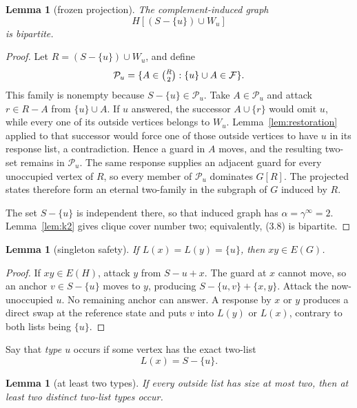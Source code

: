 \documentclass[11pt]{article}
\newtheorem{lemma}[theorem]{Lemma}
\theoremstyle{definition}
\theoremstyle{remark}
\newcommand{\gaminf}{\gamma^{\infty}}
\newcommand{\F}{\mathcal F}
\begin{document}
\begin{lemma}[frozen projection]\label{lem:frozen}
The complement-induced graph
\[
  H[(S-\{u\})\cup W_u]
\tag{3.8}
\]
is bipartite.
\end{lemma}

\begin{proof}
Let \(R=(S-\{u\})\cup W_u\), and define
\[
 \mathcal P_u=
 \{A\in\tbinom{R}{2}:\{u\}\cup A\in\F\}.
\]
This family is nonempty because \(S-\{u\}\in\mathcal P_u\).
Take \(A\in\mathcal P_u\) and attack \(r\in R-A\) from
\(\{u\}\cup A\).  If \(u\) answered, the successor \(A\cup\{r\}\)
would omit \(u\), while every one of its outside vertices belongs to
\(W_u\).  Lemma~\ref{lem:restoration} applied to that successor would
force one of those outside vertices to have \(u\) in its response list,
a contradiction.  Hence a guard in \(A\) moves, and the resulting
two-set remains in \(\mathcal P_u\).  The same response supplies an
adjacent guard for every unoccupied vertex of \(R\), so every member of
\(\mathcal P_u\) dominates \(G[R]\).  The projected states therefore form
an eternal two-family in the subgraph of \(G\) induced by \(R\).

The set \(S-\{u\}\) is independent there, so that induced graph has
\(\alpha=\gaminf=2\).  Lemma~\ref{lem:k2} gives clique cover number two;
equivalently, (3.8) is bipartite.
\end{proof}

\begin{lemma}[singleton safety]\label{lem:singleton}
If \(L(x)=L(y)=\{u\}\), then \(xy\in E(G)\).
\end{lemma}

\begin{proof}
If \(xy\in E(H)\), attack \(y\) from \(S-u+x\).  The guard at \(x\) cannot
move, so an anchor \(v\in S-\{u\}\) moves to \(y\), producing
\(S-\{u,v\}+\{x,y\}\).  Attack the now-unoccupied \(u\).  No remaining
anchor can answer.  A response by \(x\) or \(y\) produces a direct swap at
the reference state and puts \(v\) into \(L(y)\) or \(L(x)\), contrary to
both lists being \(\{u\}\).
\end{proof}

Say that \emph{type \(u\)} occurs if some vertex has the exact two-list
\[
  L(x)=S-\{u\}.
\tag{3.9}
\]

\begin{lemma}[at least two types]\label{lem:two-types}
If every outside list has size at most two, then at least two distinct
two-list types occur.
\end{lemma}
\end{document}
